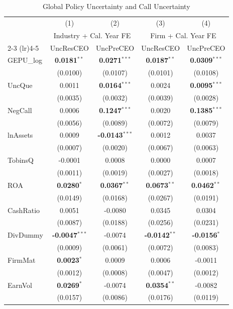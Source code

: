 \documentclass[11pt,a4paper]{article}
\begin{document}
\begin{table}[htbp]
\centering
\caption{Global Policy Uncertainty and Call Uncertainty}
\label{tab:h24b_global_epu}
\scriptsize
\begin{tabular}{lcccc}
\toprule
 & (1) & (2) & (3) & (4) \\
 & \multicolumn{2}{c}{Industry + Cal. Year FE} & \multicolumn{2}{c}{Firm + Cal. Year FE} \\
\cmidrule(lr){2-3} \cmidrule(lr){4-5}
 & UncResCEO & UncPreCEO & UncResCEO & UncPreCEO \\
\midrule
GEPU\_log & \textbf{0.0181}$^{**}$ & \textbf{0.0271}$^{***}$ & \textbf{0.0187}$^{**}$ & \textbf{0.0309}$^{***}$ \\
 & (0.0100) & (0.0107) & (0.0101) & (0.0108) \\
\midrule
UncQue & 0.0011 & \textbf{0.0164}$^{***}$ & 0.0024 & \textbf{0.0095}$^{***}$ \\
 & (0.0035) & (0.0032) & (0.0039) & (0.0028) \\
NegCall & 0.0006 & \textbf{0.1247}$^{***}$ & 0.0020 & \textbf{0.1385}$^{***}$ \\
 & (0.0056) & (0.0089) & (0.0072) & (0.0079) \\
lnAssets & 0.0009 & \textbf{-0.0143}$^{***}$ & 0.0012 & 0.0037 \\
 & (0.0007) & (0.0020) & (0.0067) & (0.0063) \\
TobinsQ & -0.0001 & 0.0008 & 0.0000 & 0.0007 \\
 & (0.0011) & (0.0019) & (0.0027) & (0.0018) \\
ROA & \textbf{0.0280}$^{*}$ & \textbf{0.0367}$^{**}$ & \textbf{0.0673}$^{**}$ & \textbf{0.0462}$^{**}$ \\
 & (0.0149) & (0.0168) & (0.0267) & (0.0191) \\
CashRatio & 0.0051 & -0.0080 & 0.0345 & 0.0304 \\
 & (0.0087) & (0.0188) & (0.0256) & (0.0231) \\
DivDummy & \textbf{-0.0047}$^{***}$ & -0.0074 & \textbf{-0.0142}$^{**}$ & \textbf{-0.0156}$^{*}$ \\
 & (0.0009) & (0.0061) & (0.0072) & (0.0083) \\
FirmMat & \textbf{0.0023}$^{*}$ & 0.0009 & 0.0006 & -0.0011 \\
 & (0.0012) & (0.0008) & (0.0047) & (0.0012) \\
EarnVol & \textbf{0.0269}$^{*}$ & -0.0074 & \textbf{0.0354}$^{**}$ & -0.0082 \\
 & (0.0157) & (0.0086) & (0.0176) & (0.0119) \\

\end{tabular}
\end{table}
\end{document}
